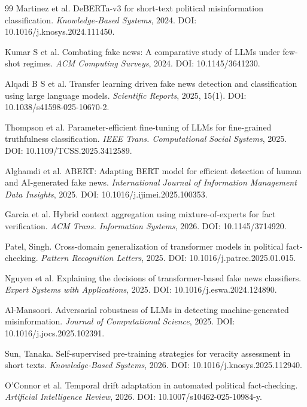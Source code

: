 \begin{thebibliography}{99}
Martinez et al. DeBERTa-v3 for short-text political misinformation
classification. \emph{Knowledge-Based Systems}, 2024.
DOI: 10.1016/j.knosys.2024.111450.

Kumar S et al. Combating fake news: A comparative study of LLMs under few-shot
regimes. \emph{ACM Computing Surveys}, 2024. DOI: 10.1145/3641230.

Alqadi B S et al. Transfer learning driven fake news detection and
classification using large language models. \emph{Scientific Reports}, 2025,
15(1). DOI: 10.1038/s41598-025-10670-2.

Thompson et al. Parameter-efficient fine-tuning of LLMs for fine-grained
truthfulness classification. \emph{IEEE Trans. Computational Social Systems},
2025. DOI: 10.1109/TCSS.2025.3412589.

Alghamdi et al. ABERT: Adapting BERT model for efficient detection of human and
AI-generated fake news. \emph{International Journal of Information Management
Data Insights}, 2025. DOI: 10.1016/j.ijimei.2025.100353.

Garcia et al. Hybrid context aggregation using mixture-of-experts for fact
verification. \emph{ACM Trans. Information Systems}, 2026.
DOI: 10.1145/3714920.

Patel, Singh. Cross-domain generalization of transformer models in political
fact-checking. \emph{Pattern Recognition Letters}, 2025.
DOI: 10.1016/j.patrec.2025.01.015.

Nguyen et al. Explaining the decisions of transformer-based fake news
classifiers. \emph{Expert Systems with Applications}, 2025.
DOI: 10.1016/j.eswa.2024.124890.

Al-Mansoori. Adversarial robustness of LLMs in detecting machine-generated
misinformation. \emph{Journal of Computational Science}, 2025.
DOI: 10.1016/j.jocs.2025.102391.

Sun, Tanaka. Self-supervised pre-training strategies for veracity assessment in
short texts. \emph{Knowledge-Based Systems}, 2026.
DOI: 10.1016/j.knosys.2025.112940.

O'Connor et al. Temporal drift adaptation in automated political fact-checking.
\emph{Artificial Intelligence Review}, 2026. DOI: 10.1007/s10462-025-10984-y.


\end{thebibliography}
